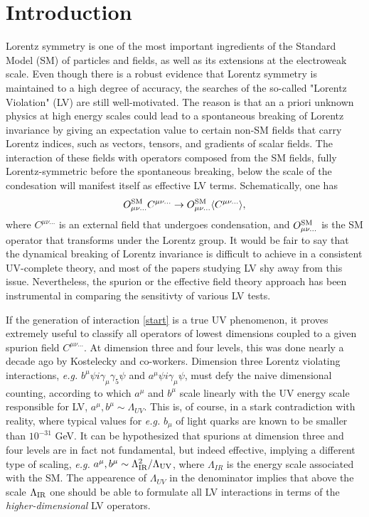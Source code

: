 \documentclass[12pt,preprintnumbers,nofootinbib]{revtex4}
\begin{document}
\section{Introduction}

	
	Lorentz symmetry is one of the most important ingredients of the 
	Standard Model (SM) of particles and fields, as well as its extensions at the 
electroweak scale. Even though there is a robust evidence that Lorentz symmetry is maintained to a 
high degree of accuracy, the searches of the so-called "Lorentz Violation" (LV) 
are still well-motivated. The reason is that an a priori unknown physics at high 
energy scales could lead to a spontaneous breaking of Lorentz invariance by 
giving an expectation value to certain non-SM fields 
that carry Lorentz indices, such as vectors, 
tensors, and gradients of scalar fields. The interaction of these fields with  operators composed 
from the SM fields, fully Lorentz-symmetric before the spontaneous breaking, below the 
scale of the condesation will manifest itself as effective LV terms. Schematically, one 
has 
\begin{equation}
O^{\rm SM}_{\mu\nu...} C^{\mu\nu...} \to O^{\rm SM}_{\mu\nu...} \langle C^{\mu\nu...} \rangle,
\label{start}
\end{equation}
where $C^{\mu\nu...}$ is an external field that undergoes condensation, and 
$O^{\rm SM}_{\mu\nu...} $ is the SM operator that transforms under 
the Lorentz group. It would be fair to say that the dynamical breaking of Lorentz 
invariance is difficult to achieve in a consistent UV-complete theory, and most of the 
papers studying LV shy away from this issue. 
 Nevertheless, the spurion or the effective field theory approach has been instrumental in 
comparing the sensitivty of various LV tests. 
	
If the generation of interaction \eqref{start} is a true UV phenomenon, it proves extremely useful 
to classify all operators of lowest dimensions coupled to a given spurion field $	C^{\mu\nu...}$.
At dimension three and four levels, this was done nearly a decade ago by Kostelecky and co-workers. 
Dimension three Lorentz violating interactions, {\em e.g.} $b^\mu \psi i\gamma_\mu\gamma_5\psi$ and 
 $a^\mu \psi i\gamma_\mu\psi$, must defy the naive dimensional counting, according to which $
 a^\mu$ and $b^\mu$ scale linearly with the UV energy scale responsible for LV, 
$a^\mu,b^\mu \sim \Lambda_{UV}$. This is, of course, in a stark contradiction with reality, 
where typical values for {\em e.g.} $b_\mu$ of light quarks are known to be smaller than 
$10^{-31}$ GeV. It can be hypothesized that spurions at dimension three and four levels are in fact 
not fundamental, but indeed effective, implying a different type of scaling, {\em e.g.} 
$a^\mu,b^\mu \sim \Lambda_{\rm IR}^2/\Lambda_{\rm UV}$, where $\Lambda_{IR}$ is the energy scale 
associated with the SM. The appearence of $\Lambda_{UV}$ in the denominator implies that above the 
scale $\Lambda_{\rm IR}$ one should be able to formulate all LV interactions in terms of the  
{\em higher-dimensional} LV operators.  
\end{document}

